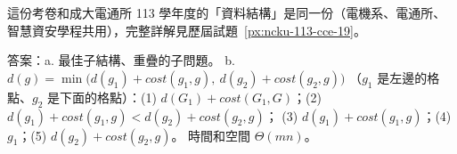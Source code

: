 \begin{pastsoln}
這份考卷和成大電通所 113 學年度的「資料結構」是同一份（電機系、電通所、智慧資安學程共用），完整詳解見歷屆試題~\ref{px:ncku-113-cce-19}。

答案：a. 最佳子結構、重疊的子問題。 b. $d(g) = \min\bigl(d(g_1) + \mathit{cost}(g_1, g),\ d(g_2) + \mathit{cost}(g_2, g)\bigr)$
（$g_1$ 是左邊的格點、$g_2$ 是下面的格點）：(1) $d(G_1) + \mathit{cost}(G_1, G)$；(2) $d(g_1) + \mathit{cost}(g_1, g) < d(g_2) + \mathit{cost}(g_2, g)$；
(3) $d(g_1) + \mathit{cost}(g_1, g)$；(4) $g_1$；(5) $d(g_2) + \mathit{cost}(g_2, g)$。 時間和空間 $\Theta(mn)$。
\end{pastsoln}
